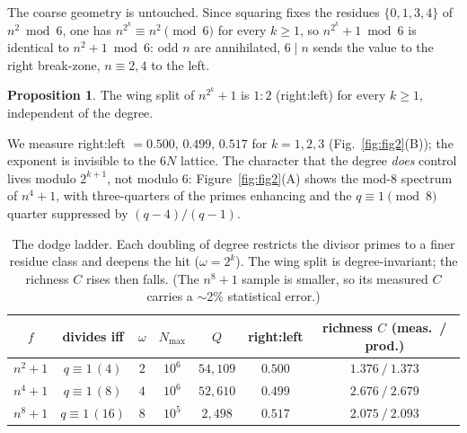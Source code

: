 \documentclass[11pt]{article}
\theoremstyle{definition}
\newtheorem{proposition}{Proposition}
\begin{document}
The coarse geometry is untouched. Since squaring fixes the residues $\{0,1,3,4\}$ of $n^2\bmod6$, one
has $n^{2^k}\equiv n^2\pmod6$ for every $k\ge1$, so $n^{2^k}+1\bmod6$ is identical to $n^2+1\bmod6$:
odd $n$ are annihilated, $6\mid n$ sends the value to the right break-zone, $n\equiv2,4$ to the left.

\begin{proposition}
The wing split of $n^{2^k}+1$ is $1{:}2$ (right:left) for every $k\ge1$, independent of the degree.
\end{proposition}
\noindent We measure right:left $=0.500,\,0.499,\,0.517$ for $k=1,2,3$ (Fig.~\ref{fig:fig2}(B)); the
exponent is invisible to the $6N$ lattice. The character that the degree \emph{does} control lives
modulo $2^{k+1}$, not modulo $6$: Figure~\ref{fig:fig2}(A) shows the mod-$8$ spectrum of $n^4+1$, with
three-quarters of the primes enhancing and the $q\equiv1\pmod8$ quarter suppressed by $(q-4)/(q-1)$.

\begin{table}[t]
\centering\small
\begin{tabular}{ccccccc}
\toprule
$f$ & divides iff & $\omega$ & $N_{\max}$ & $Q$ & right:left & richness $C$ (meas.\ / prod.)\\
\midrule
$n^2+1$ & $q\equiv1\,(4)$  & $2$ & $10^6$ & $54{,}109$ & $0.500$ & $1.376\ /\ 1.373$\\
$n^4+1$ & $q\equiv1\,(8)$  & $4$ & $10^6$ & $52{,}610$ & $0.499$ & $2.676\ /\ 2.679$\\
$n^8+1$ & $q\equiv1\,(16)$ & $8$ & $10^5$ & $2{,}498$  & $0.517$ & $2.075\ /\ 2.093$\\
\bottomrule
\end{tabular}
\caption{The dodge ladder. Each doubling of degree restricts the divisor primes to a finer residue
class and deepens the hit ($\omega=2^k$). The wing split is degree-invariant; the richness $C$ rises
then falls. (The $n^8+1$ sample is smaller, so its measured $C$ carries a $\sim$2\% statistical error.)}
\label{tab:ladder}
\end{table}
\end{document}
